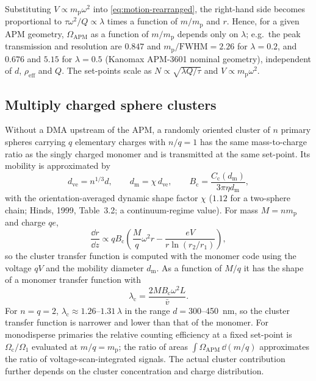 \documentclass[11pt,a4paper]{article}
\begin{document}
Substituting $V \propto m_{\mathrm{p}}\omega^{2}$ into
\eqref{eq:motion-rearranged}, the right-hand side becomes proportional to
$\tau\omega^{2}/Q \propto \lambda$ times a function of $m/m_{\mathrm{p}}$ and
$r$. Hence, for a given APM geometry, $\Omega_{\mathrm{APM}}$ as a function
of $m/m_{\mathrm{p}}$ depends only on $\lambda$; e.g.\ the peak transmission
and resolution are $0.847$ and $m_{\mathrm{p}}/\mathrm{FWHM} = 2.26$ for
$\lambda = 0.2$, and $0.676$ and $5.15$ for $\lambda = 0.5$ (Kanomax APM-3601
nominal geometry), independent of $d$, $\rho_{\mathrm{eff}}$ and $Q$. The
set-points scale as $N \propto \sqrt{\lambda Q/\tau}$ and
$V \propto m_{\mathrm{p}}\omega^{2}$.

\subsection{Multiply charged sphere clusters}
\label{sec:cluster}

Without a DMA upstream of the APM, a randomly oriented cluster of $n$
primary spheres carrying $q$ elementary charges with $n/q = 1$ has the same
mass-to-charge ratio as the singly charged monomer and is transmitted at the
same set-point. Its mobility is approximated by
\begin{equation}
  d_{\mathrm{ve}} = n^{1/3} d, \qquad
  d_{\mathrm{m}} = \chi\, d_{\mathrm{ve}}, \qquad
  B_{\mathrm{c}} = \frac{C_{\mathrm{c}}(d_{\mathrm{m}})}{3\pi\eta d_{\mathrm{m}}},
  \label{eq:cluster-mobility}
\end{equation}
with the orientation-averaged dynamic shape factor $\chi$ ($1.12$ for a
two-sphere chain; Hinds, 1999, Table~3.2; a continuum-regime value). For
mass $M = n m_{\mathrm{p}}$ and charge $qe$,
\begin{equation}
  \frac{\dd r}{\dd z} \propto q B_{\mathrm{c}}
  \left( \frac{M}{q}\omega^{2}r - \frac{eV}{r\ln(r_{2}/r_{1})} \right),
  \label{eq:cluster-motion}
\end{equation}
so the cluster transfer function is computed with the monomer code using the
voltage $qV$ and the mobility diameter $d_{\mathrm{m}}$. As a function of
$M/q$ it has the shape of a monomer transfer function with
\begin{equation}
  \lambda_{\mathrm{c}} = \frac{2 M B_{\mathrm{c}} \omega^{2} L}{\bar{v}}.
  \label{eq:cluster-lambda}
\end{equation}
For $n = q = 2$, $\lambda_{\mathrm{c}} \approx 1.26$--$1.31\,\lambda$ in the
range $d = 300$--\SI{450}{\nano\meter}, so the cluster transfer function is
narrower and lower than that of the monomer. For monodisperse primaries the
relative counting efficiency at a fixed set-point is
$\Omega_{\mathrm{c}}/\Omega_{1}$ evaluated at $m/q = m_{\mathrm{p}}$; the
ratio of areas $\int\Omega_{\mathrm{APM}}\,\dd(m/q)$ approximates the ratio of
voltage-scan-integrated signals. The actual cluster contribution further
depends on the cluster concentration and charge distribution.
\end{document}
